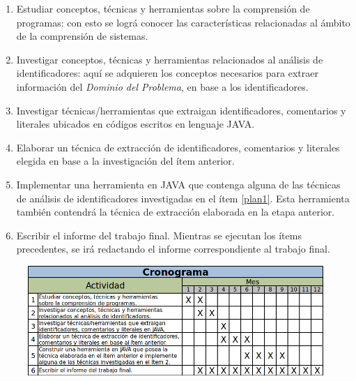\documentclass[a4paper,12pt]{article}
\begin{document}
\begin{enumerate}
\item Estudiar conceptos, técnicas y herramientas sobre la comprensión de programas: con esto se lográ conocer las características relacionadas al ámbito de la comprensión de sistemas.

\item\label{plan1} Investigar conceptos, técnicas y herramientas relacionados al análisis de identificadores: aquí se adquieren los conceptos necesarios para extraer información del \textit{Dominio del Problema}, en base a los identificadores.


\item Investigar técnicas/herramientas que extraigan identificadores, comentarios y literales ubicados en códigos  escritos en lenguaje JAVA.

\item Elaborar un técnica de extracción de identificadores, comentarios y literales elegida en base a la investigación del ítem anterior.

\item Implementar una herramienta en JAVA que  contenga alguna de las técnicas de análisis de identificadores investigadas en el ítem \ref{plan1}. Esta herramienta también contendrá la técnica de extracción elaborada en la etapa anterior.

\item Escribir el informe del trabajo final. Mientras se ejecutan los ítems precedentes, se irá redactando el informe correspondiente al trabajo final.
\end{enumerate}


\begin{figure}[b] %
\centerline{%
\includegraphics[scale= 0.75]{./crono.png}
}
\end{figure} 
\end{document}
